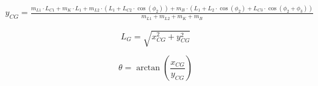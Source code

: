 	\begin{equation}
		\begin{aligned}
			y_{CG} = \frac{m_{L1} \cdot L_{C1} + m_K \cdot L_1 + m_{L2} \cdot (L_1 + L_{C2} \cdot \cos(\phi_2)) + m_B \cdot (L_1 + L_2 \cdot \cos(\phi_2) + L_{C3} \cdot \cos(\phi_2 + \phi_3))}{m_{L1} + m_{L2} + m_K + m_B}
		\end{aligned}
	\end{equation}
	
	
	\begin{equation}
		L_G = \sqrt{x_{CG}^2 + y_{CG}^2}
	\end{equation}
	
	\begin{equation}
		\theta = \arctan\left(\frac{{x_{CG}}}{{y_{CG}}}\right)
	\end{equation}
	
